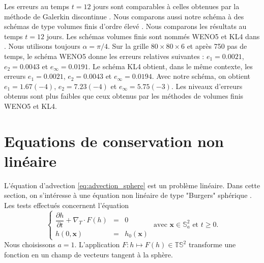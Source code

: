 Les erreurs au temps $t=12$ jours sont comparables à celles obtenues par la méthode de Galerkin discontinue \cite{Nair2008}. Nous comparons aussi notre schéma à des schémas de type volumes finis d'ordre élevé \cite{Katta2015}. Nous comparons les résultats au temps $t=12$ jours. Les schémas volumes finis sont nommés WENO5 et KL4 dans \cite{Katta2015}. Nous utilisons toujours $\alpha = \pi/4$. Sur la grille $80 \times 80 \times 6$ et après 750 pas de temps, le schéma WENO5 donne les erreurs relatives suivantes : $e_1 = 0.0021$, $e_2 = 0.0043$ et $e_{\infty} = 0.0191$. Le schéma KL4 obtient, dans le même contexte, les erreurs $e_1 = 0.0021$, $e_2 = 0.0043$ et $e_{\infty} = 0.0194$. Avec notre schéma, on obtient $e_1 = 1.67(-4)$, $e_2=7.23(-4)$ et $e_{\infty} = 5.75(-3)$. Les niveaux d'erreurs obtenus sont plus faibles que ceux obtenus par les méthodes de volumes finis WENO5 et KL4.


























\section{Equations de conservation non linéaire}

L'équation d'advection \eqref{eq:advection_sphere} est un problème linéaire. Dans cette section, on s'intéresse à une équation non linéaire de type "Burgers" sphérique \cite{BenArtzi2009}. Les tests effectués concernent l'équation
\begin{equation}
\left\lbrace
\begin{array}{rcl}
\dfrac{\partial h}{\partial t} + \nabla_T \cdot F(h) & = & 0 \\
h(0,\mathbf{x}) & = & h_0(\mathbf{x})
\end{array}
\right. \text{ avec } \mathbf{x} \in \mathbb{S}^2_a \text{ et } t \geq 0.
\label{eq:advection_sphere_NL}
\end{equation}
Nous choisissons $a = 1$. L'application $F : h \mapsto F(h) \in \mathbb{T}\mathbb{S}^2$ transforme une fonction en un champ de vecteurs tangent à la sphère.

